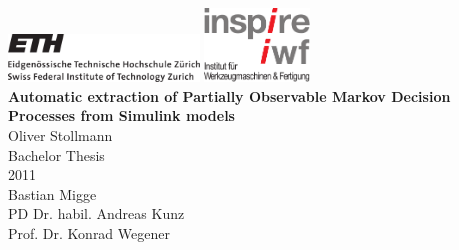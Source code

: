 \documentclass[paper=a4,twoside=true,fontsize=11pt,numbers=noendperiod,chapterprefix=false]{scrbook}
\begin{document}
\begin{titlepage}
	\topmargin -3.8cm
	\oddsidemargin 0.0cm
	\evensidemargin 0.0cm
	\centering
	\includegraphics*[width=0.38\textwidth]{media/ETH_logo} \hfill
	\includegraphics*[width=0.21\textwidth]{media/logo_inspire_iwf} \\
	\vspace{8.2cm}
	\Huge
	\textbf{\textsf{Automatic extraction of Partially Observable Markov Decision Processes from Simulink models}} \\[2.0cm]
	\vspace{2.0cm}
	\sffamily
	\Large
	Oliver Stollmann
	\\[0.8cm]
	\large
	Bachelor Thesis
	\\
	2011
	\\[0.8cm] %
	Bastian Migge
	\\
	PD Dr. habil. Andreas Kunz
	\\[0.5cm]
	Prof. Dr. Konrad Wegener
	\vfill
\end{titlepage}
\clearemptydoublepage

\setcounter{page}{1}
\end{document}
